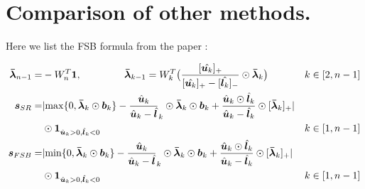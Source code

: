 \section{Comparison of other methods.}

\label{sec4p5}

Here we list the FSB formula from the paper \cite{FSB}:

\begin{align*}
	\bm{\bar{\lambda}}_{n-1} =& -W^T_n\bm{1}, \hspace*{10ex}  	\bm{\bar{\lambda}}_{k-1} = W^T_k\big(\dfrac{[\hat{\bm{u}_k}]_+}{[\hat{\bm{u}_k}]_+-[\hat{\bm{l}_k}]_-}\odot\bm{\bar{\lambda}}_{k}\big) \hspace*{-10ex}  &k\in [2,n-1]\\
	\bm{s}_{SR} =& \lvert\max\{0,\bm{\bar{\lambda}}_{k}\odot\bm{b}_{k}\}-\frac{\hat{\bm{u}}_k}{\hat{\bm{u}}_k-\hat{\bm{l}}}_k\odot\bm{\bar{\lambda}}_{k}\odot\bm{{b}}_{k}+\frac{\hat{\bm{u}}_k\odot\hat{\bm{l}}_k}{\hat{\bm{u}}_k-\hat{\bm{l}}_k}\odot[\bm{\bar{\lambda}}_{k}]_+\rvert &\\
	&\odot\bm{1}_{\hat{\bm{u}}_k>0,\hat{\bm{l}}_k<0}&k\in [1,n-1]\\
	\bm{s}_{FSB} =& \lvert\min\{0,\bm{\bar{\lambda}}_{k}\odot\bm{b}_{k}\}-\frac{\hat{\bm{u}}_k}{\hat{\bm{u}}_k-\hat{\bm{l}}}_k\odot\bm{\bar{\lambda}}_{k}\odot\bm{{b}}_{k}+\frac{\hat{\bm{u}}_k\odot\hat{\bm{l}}_k}{\hat{\bm{u}}_k-\hat{\bm{l}}_k}\odot[\bm{\bar{\lambda}}_{k}]_+\rvert &\\
	&\odot\bm{1}_{\hat{\bm{u}}_k>0,\hat{\bm{l}}_k<0}&k\in [1,n-1]\\
\end{align*}



